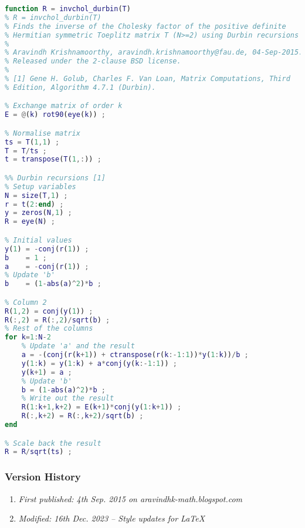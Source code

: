 \begin{lstlisting}[language=MATLAB,numbers=none]
function R = invchol_durbin(T)
% R = invchol_durbin(T)
% Finds the inverse of the Cholesky factor of the positive definite
% Hermitian symmetric Toeplitz matrix T (N>=2) using Durbin recursions [1].
%
% Aravindh Krishnamoorthy, aravindh.krishnamoorthy@fau.de, 04-Sep-2015.
% Released under the 2-clause BSD license.
%
% [1] Gene H. Golub, Charles F. Van Loan, Matrix Computations, Third
% Edition, Algorithm 4.7.1 (Durbin).

% Exchange matrix of order k
E = @(k) rot90(eye(k)) ;

% Normalise matrix
ts = T(1,1) ;
T = T/ts ;
t = transpose(T(1,:)) ;

%% Durbin recursions [1]
% Setup variables
N = size(T,1) ;
r = t(2:end) ;
y = zeros(N,1) ;
R = eye(N) ;

% Initial values
y(1) = -conj(r(1)) ;
b    = 1 ;
a    = -conj(r(1)) ;
% Update 'b'
b    = (1-abs(a)^2)*b ;

% Column 2
R(1,2) = conj(y(1)) ;
R(:,2) = R(:,2)/sqrt(b) ;
% Rest of the columns
for k=1:N-2
	% Update 'a' and the result
	a = -(conj(r(k+1)) + ctranspose(r(k:-1:1))*y(1:k))/b ;
	y(1:k) = y(1:k) + a*conj(y(k:-1:1)) ;
	y(k+1) = a ;
	% Update 'b'
	b = (1-abs(a)^2)*b ;
	% Write out the result
	R(1:k+1,k+2) = E(k+1)*conj(y(1:k+1)) ;
	R(:,k+2) = R(:,k+2)/sqrt(b) ;
end

% Scale back the result
R = R/sqrt(ts) ;
\end{lstlisting}

\subsubsection{Version History}
\begin{enumerate}
	\item \emph{First published: 4th Sep. 2015 on aravindhk-math.blogspot.com}
	\item \emph{Modified: 16th Dec. 2023 -- Style updates for \LaTeX}
\end{enumerate}
